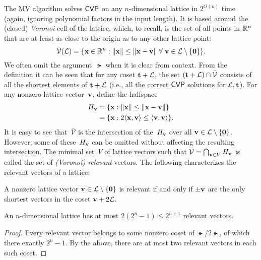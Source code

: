 \documentclass[11pt]{article}
\begin{document}
\newcommand{\Vbar}{\ensuremath{\bar{\mathcal{V}}}}

The MV algorithm solves $\mathsf{CVP}$ on any $n$-dimensional lattice in
$2^{O(n)}$ time (again, ignoring polynomial factors in the input
length). It is based around the (closed) \emph{Voronoi} cell of the
lattice, which, to recall, is the set of all points in $\mathbb{R}^{n}$ that
are at least as close to the origin as to any other lattice point:
\begin{equation}
  \label{eq:voronoi}
  \Vbar(\lat) = \set{\vecx \in \R^n : \length{\vecx} \leq
    \length{\vecx - \vecv} \; \forall\;
    \vecv \in \lat \setminus \set{\veczero} }.
\end{equation}
We often omit the argument~$\lat$ when it is clear from context. From
the definition it can be seen that for any coset $\mathbf{t}+\mathcal{L}$, the set
$(\vect+\lat) \cap \Vbar$ consists of all the shortest elements of
$\mathbf{t}+\mathcal{L}$ (i.e., all the correct $\mathsf{CVP}$ solutions for
$\mathcal{L},\mathbf{t}$). For any nonzero lattice vector~$\mathbf{v}$, define the
halfspace
\begin{align}
  \label{eq:Hv}
  H_{\mathbf{v}}
  &= \{ \mathbf{x} : \lVert\mathbf{x}\rVert \leq \lVert\mathbf{x}-\mathbf{v}\rVert\} \\
  &= \{\mathbf{x} : 2\langle\mathbf{x}, \mathbf{v}\rangle \leq \langle\mathbf{v}, \mathbf{v}\rangle\}.
\end{align}
It is easy to see that~$\Vbar$ is the intersection of the~$H_{\mathbf{v}}$
over all $\mathbf{v} \in \mathcal{L} \setminus \{\mathbf{0}\}$. However, some of
these~$H_{\mathbf{v}}$ can be omitted without affecting the resulting
intersection. The minimal set~$V$ of lattice vectors such that
$\Vbar = \bigcap_{\vecv \in V} H_{\vecv}$ is called the set of
\emph{(Voronoi) relevant} vectors. The following characterizes the
relevant vectors of a lattice:

\begin{fact}[Voronoi]
  \label{fact:voronoi}
  A nonzero lattice vector $\mathbf{v} \in \mathcal{L} \setminus \{\mathbf{0}\}$
  is relevant if and only if $\pm \mathbf{v}$ are the only shortest vectors
  in the coset $\mathbf{v} + 2\mathcal{L}$.
\end{fact}

\begin{corollary}
  An $n$-dimensional lattice has at most $2(2^{n}-1) \leq 2^{n+1}$
  relevant vectors.
\end{corollary}

\begin{proof}
  Every relevant vector belongs to some nonzero coset of $\lat/2\lat$,
  of which there exactly $2^{n}-1$. By the above, there are at most
  two relevant vectors in each such coset.
\end{proof}
\end{document}

